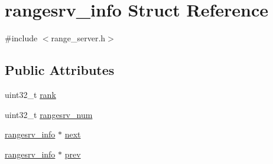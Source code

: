 \hypertarget{structrangesrv__info}{\section{rangesrv\-\_\-info Struct Reference}
\label{da/dce/structrangesrv__info}
}


{\ttfamily \#include $<$range\-\_\-server.\-h$>$}

\subsection*{Public Attributes}
\begin{DoxyCompactItemize}
\item 
uint32\-\_\-t \hyperlink{structrangesrv__info_af545372bc5a40a38b84408a208866960}{rank}
\item 
uint32\-\_\-t \hyperlink{structrangesrv__info_a90a6558f7f1922ae3394838255a937f3}{rangesrv\-\_\-num}
\item 
\hyperlink{structrangesrv__info}{rangesrv\-\_\-info} $\ast$ \hyperlink{structrangesrv__info_a7f87ab56d045e24e315b354075208b6d}{next}
\item 
\hyperlink{structrangesrv__info}{rangesrv\-\_\-info} $\ast$ \hyperlink{structrangesrv__info_af0a671859e5383bf4bab7f7a53b49b3b}{prev}
\end{DoxyCompactItemize}



